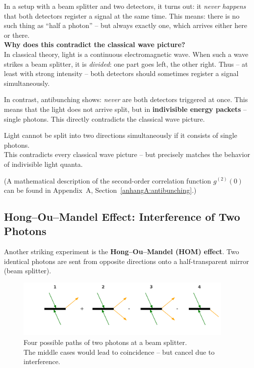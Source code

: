 In a setup with a beam splitter and two detectors, it turns out: it \emph{never happens} that both detectors register a signal at the same time. This means: there is no such thing as “half a photon” – but always exactly one, which arrives either here or there.\\

\textbf{Why does this contradict the classical wave picture?} \\
In classical theory, light is a continuous electromagnetic wave. When such a wave strikes a beam splitter, it is \emph{divided}: one part goes left, the other right. Thus – at least with strong intensity – both detectors should sometimes register a signal simultaneously.

In contrast, antibunching shows: \emph{never} are both detectors triggered at once. This means that the light does not arrive split, but in \textbf{indivisible energy packets} – single photons. This directly contradicts the classical wave picture.

\vspace{1em}
\begin{tcolorbox}[physikbox, title=What Antibunching Shows]
	\label{box:wasAntibunching}
	\small
	Light cannot be split into two directions simultaneously if it consists of single photons.\\
	This contradicts every classical wave picture – but precisely matches the behavior of indivisible light quanta.
\end{tcolorbox}
\vspace{1em}
(A mathematical description of the second-order correlation function \( g^{(2)}(0) \) can be found in Appendix~A, Section~\ref{anhangA:antibunching}.) 

\subsection{Hong–Ou–Mandel Effect: Interference of Two Photons}

Another striking experiment is the \textbf{Hong–Ou–Mandel (HOM) effect}. Two identical photons are sent from opposite directions onto a half-transparent mirror (beam splitter).

\begin{figure}[H]
	\begin{center}
		\includegraphics[width=0.95\textwidth]{bilder/hom_interferenzpfade_korrigiert.png}
	\end{center}
	\caption{Four possible paths of two photons at a beam splitter.\\
		The middle cases would lead to coincidence – but cancel due to interference.}
\end{figure}

